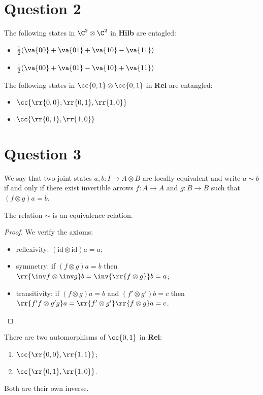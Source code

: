 \documentclass{article}
\begin{document}
\section*{Question 2}

The following states in $\C^2\otimes\C^2$ in \textbf{Hilb} are entagled:
\begin{itemize}
  \item $\frac{1}{2}(\va{00}+\va{01}+\va{10}-\va{11})$
  \item $\frac{1}{2}(\va{00}+\va{01}-\va{10}+\va{11})$
\end{itemize}
The following states in $\cc{0,1}\otimes\cc{0,1}$ in \textbf{Rel} are entangled:
\begin{itemize}
  \item $\cc{\rr{0,0},\rr{0,1},\rr{1,0}}$
  \item $\cc{\rr{0,1},\rr{1,0}}$
\end{itemize}

\section*{Question 3}

We say that two joint states $a,b:I\to A\otimes B$ are locally equivalent and write $a\sim b$
if and only if there exist invertible arrows $f:A\to A$ and $g:B\to B$ such that
$(f\otimes g)a = b$.

\begin{claim*}[a]
  The relation $\sim$ is an equivalence relation.
  \begin{proof}
    We verify the axioms:
    \begin{itemize}
      \item reflexivity: $(\text{id}\otimes\text{id})a=a$;
      \item symmetry: if $(f\otimes g)a=b$ then $\rr{\inv f\otimes\inv g}b=\inv{\rr{f\otimes g}}b=a$;
      \item transitivity: if $(f\otimes g)a=b$ and $(f'\otimes g')b=c$ then $\rr{f'f\otimes g'g}a=\rr{f'\otimes g'}\rr{f\otimes g}a=c$.
    \end{itemize}
  \end{proof}
\end{claim*}

\begin{answer*}[b]
  There are two automorphisms of $\cc{0,1}$ in \textbf{Rel}:
  \begin{enumerate}
    \item $\cc{\rr{0,0},\rr{1,1}}$;
    \item $\cc{\rr{0,1},\rr{1,0}}$.
  \end{enumerate}
  Both are their own inverse.
\end{answer*}
\end{document}
